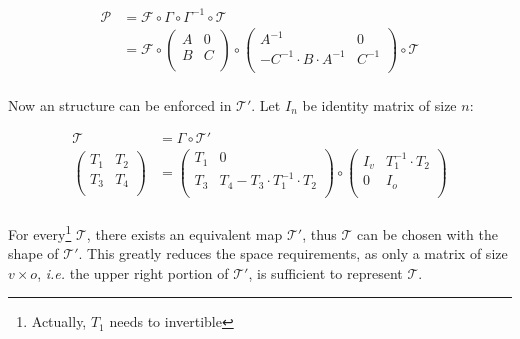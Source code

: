 \documentclass{ufsctex/ufsctex}
\begin{document}
\begin{equation}
\begin{split}
\mathcal{P} &= \mathcal{F} \circ \Gamma \circ \Gamma^{-1} \circ \mathcal{T} \\
&=
\mathcal{F} \circ
\begin{pmatrix}
A & 0 \\
B & C \\
\end{pmatrix}
\circ
\begin{pmatrix}
A^{-1} & 0 \\
-C^{-1} \cdot B \cdot A^{-1} & C^{-1} \\
\end{pmatrix}
\circ
\mathcal{T} \\
\end{split}
\end{equation}

Now an structure can be enforced in $\mathcal{T'}$. Let $I_n$ be identity
matrix of size $n$:

\begin{equation}
\begin{split}
\mathcal{T} &= \Gamma \circ \mathcal{T'} \\
\begin{pmatrix}
T_1 & T_2 \\
T_3 & T_4 \\
\end{pmatrix}
&=
\begin{pmatrix}
T_1 & 0 \\
T_3 & T_4 - T_3 \cdot T_1^{-1} \cdot T_2 \\
\end{pmatrix}
\circ
\begin{pmatrix}
I_v & T_1^{-1} \cdot T_2 \\
0 & I_o \\
\end{pmatrix} \\
\end{split}
\end{equation}

For every\footnote{Actually, $T_1$ needs to invertible} $\mathcal{T}$, there
exists an equivalent map $\mathcal{T'}$, thus $\mathcal{T}$ can be chosen with
the shape of $\mathcal{T'}$. This greatly reduces the space requirements, as
only a matrix of size $v \times o$, \textit{i.e.} the upper right portion of
$\mathcal{T'}$, is sufficient to represent $\mathcal{T}$.
\end{document}

